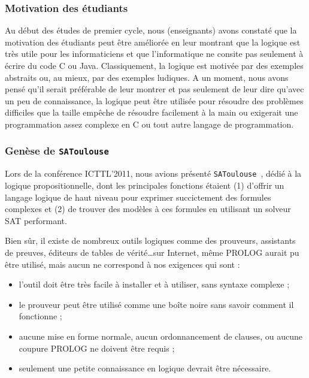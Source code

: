 \documentclass{iaf}
\newcommand{\satoulouse}{{\sc Satoulouse}\xspace}
\renewcommand{\satoulouse}{{\sc \texttt {SAToulouse}}}
\begin{document}
\subsubsection*{Motivation des \'etudiants}
Au d\'ebut des \'etudes de premier cycle, nous (enseignants) avons constat\'e que la motivation des \'etudiants peut \^etre am\'elior\'ee en leur montrant que la logique est tr\`es utile pour les informaticiens et que l'informatique ne consite pas seulement \`a \'ecrire du code C ou Java. Classiquement, la logique est motiv\'ee par des exemples abstraits ou, au mieux, par des exemples ludiques. A un moment, nous avons pens\'e qu'il serait pr\'ef\'erable de leur montrer et pas seulement de leur dire qu'avec un peu de connaissance, la logique peut \^etre utilis\'ee pour r\'esoudre des probl\`emes difficiles que la taille emp\^eche de r\'esoudre facilement \`a la main ou exigerait une programmation assez complexe en C ou tout autre langage de programmation. \\

\subsubsection*{Gen\`ese de \satoulouse}

Lors de la conf\'erence ICTTL'2011, nous avions pr\'esent\'e \satoulouse\ \cite{GaScSt2011}, d\'edi\'e \`a la logique propositionnelle, dont les principales fonctions \'etaient (1) d'offrir un langage logique de haut niveau pour exprimer succictement des formules complexes et (2) de trouver des mod\`eles \`a ces formules en utilisant un solveur SAT performant.

Bien s\^ur, il existe de nombreux outils logiques comme des prouveurs, assistants de preuves, \'editeurs de tables de v\'erit\'e\ldots sur Internet, m\^eme PROLOG aurait pu \^etre utilis\'e, mais aucun ne correspond \`a nos exigences qui sont :
\begin{itemize}
\item l'outil doit \^etre tr\`es facile \`a installer et \`a utiliser, sans syntaxe complexe ;
\item le prouveur peut \^etre utilis\'e comme une bo\^ite noire sans savoir comment il fonctionne ;
\item  aucune mise en forme normale,  aucun ordonnancement de clauses, ou aucune coupure PROLOG ne doivent \^etre requis ;
\item seulement une petite connaissance en logique devrait \^etre n\'ecessaire.
\end{itemize} 
\end{document}
